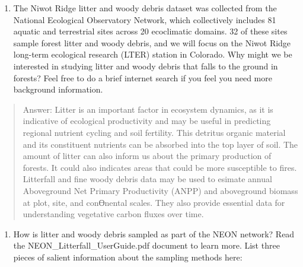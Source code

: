 \documentclass[]{article}
\providecommand{\tightlist}{%
  \setlength{\itemsep}{0pt}\setlength{\parskip}{0pt}}
\begin{document}
\begin{enumerate}
\def\labelenumi{\arabic{enumi}.}
\setcounter{enumi}{2}
\tightlist
\item
  The Niwot Ridge litter and woody debris dataset was collected from the
  National Ecological Observatory Network, which collectively includes
  81 aquatic and terrestrial sites across 20 ecoclimatic domains. 32 of
  these sites sample forest litter and woody debris, and we will focus
  on the Niwot Ridge long-term ecological research (LTER) station in
  Colorado. Why might we be interested in studying litter and woody
  debris that falls to the ground in forests? Feel free to do a brief
  internet search if you feel you need more background information.
\end{enumerate}

\begin{quote}
Answer: Litter is an important factor in ecosystem dynamics, as it is
indicative of ecological productivity and may be useful in predicting
regional nutrient cycling and soil fertility. This detritus organic
material and its constituent nutrients can be absorbed into the top
layer of soil. The amount of litter can also inform us about the primary
production of forests. It could also indicates areas that could be more
susceptible to fires. Litterfall and fine woody debris data may be used
to esimate annual Aboveground Net Primary Productivity (ANPP) and
aboveground biomass at plot, site, and conƟnental scales. They also
provide essential data for understanding vegetative carbon fluxes over
time.
\end{quote}

\begin{enumerate}
\def\labelenumi{\arabic{enumi}.}
\setcounter{enumi}{3}
\tightlist
\item
  How is litter and woody debris sampled as part of the NEON network?
  Read the NEON\_Litterfall\_UserGuide.pdf document to learn more. List
  three pieces of salient information about the sampling methods here:
\end{enumerate}
\end{document}
